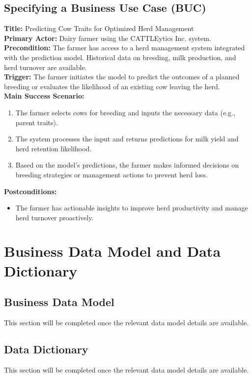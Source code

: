 \documentclass[12pt]{article}
\begin{document}
\subsection{Specifying a Business Use Case (BUC)}

\textbf{Title:} Predicting Cow Traits for Optimized Herd Management\\
\textbf{Primary Actor:} Dairy farmer using the CATTLEytics Inc. system.\\
\textbf{Precondition:} The farmer has access to a herd management system 
integrated with the prediction model. Historical data on breeding, milk 
production, and herd turnover are available.\\
\textbf{Trigger:} The farmer initiates the model to predict the outcomes of a 
planned breeding or evaluates the likelihood of an existing cow leaving the herd.\\
\textbf{Main Success Scenario:}
\begin{enumerate}
    \item The farmer selects cows for breeding and inputs the necessary data 
    (e.g., parent traits).
    \item The system processes the input and returns predictions for milk yield 
    and herd retention likelihood.
    \item Based on the model's predictions, the farmer makes informed decisions 
    on breeding strategies or management actions to prevent herd loss.
\end{enumerate}
\textbf{Postconditions:}
\begin{itemize}
    \item The farmer has actionable insights to improve herd productivity and 
    manage herd turnover proactively.
\end{itemize}

\section{Business Data Model and Data Dictionary}
\subsection{Business Data Model}
This section will be completed once the relevant data model details are available.
\subsection{Data Dictionary}
This section will be completed once the relevant data model details are available.
\end{document}
